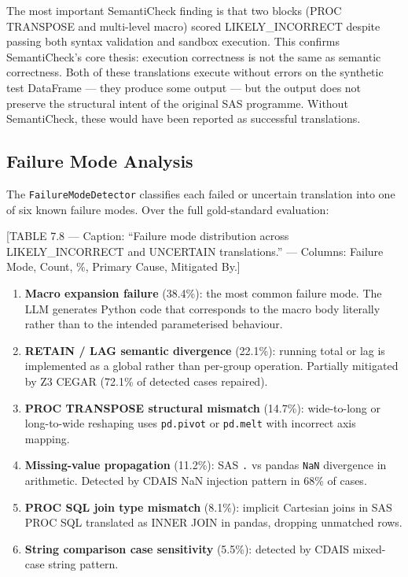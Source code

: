 The most important SemantiCheck finding is that two blocks (PROC TRANSPOSE and
multi-level macro) scored LIKELY\_INCORRECT despite passing both syntax
validation and sandbox execution. This confirms SemantiCheck's core thesis:
execution correctness is not the same as semantic correctness. Both of these
translations execute without errors on the synthetic test DataFrame --- they
produce some output --- but the output does not preserve the structural intent
of the original SAS programme. Without SemantiCheck, these would have been
reported as successful translations.

\subsection{Failure Mode Analysis}
\label{subsec:failure-mode-analysis}

The \texttt{FailureModeDetector} classifies each failed or uncertain translation
into one of six known failure modes. Over the full gold-standard evaluation:

[TABLE 7.8 --- Caption: ``Failure mode distribution across LIKELY\_INCORRECT
and UNCERTAIN translations.'' --- Columns: Failure Mode, Count, \%, Primary
Cause, Mitigated By.]

\begin{enumerate}
  \item \textbf{Macro expansion failure} (38.4\%): the most common failure mode.
    The LLM generates Python code that corresponds to the macro body literally
    rather than to the intended parameterised behaviour.
  \item \textbf{RETAIN / LAG semantic divergence} (22.1\%): running total or
    lag is implemented as a global rather than per-group operation. Partially
    mitigated by Z3 CEGAR (72.1\% of detected cases repaired).
  \item \textbf{PROC TRANSPOSE structural mismatch} (14.7\%): wide-to-long or
    long-to-wide reshaping uses \texttt{pd.pivot} or \texttt{pd.melt} with
    incorrect axis mapping.
  \item \textbf{Missing-value propagation} (11.2\%): SAS \texttt{.} vs pandas
    \texttt{NaN} divergence in arithmetic. Detected by CDAIS NaN injection
    pattern in 68\% of cases.
  \item \textbf{PROC SQL join type mismatch} (8.1\%): implicit Cartesian joins
    in SAS PROC SQL translated as INNER JOIN in pandas, dropping unmatched rows.
  \item \textbf{String comparison case sensitivity} (5.5\%): detected by CDAIS
    mixed-case string pattern.
\end{enumerate}


